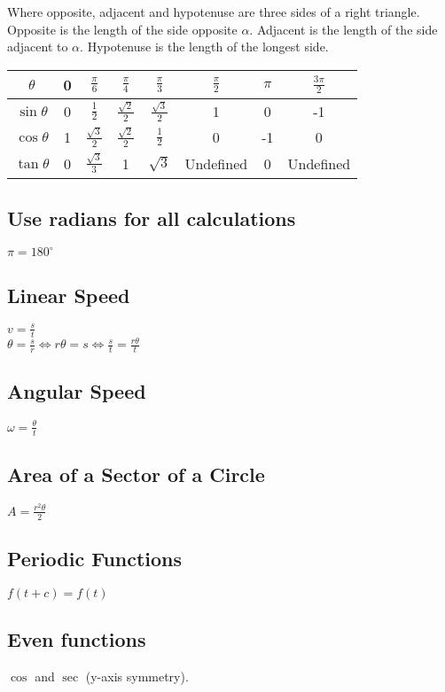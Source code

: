 \documentclass{amsart}
\begin{document}
\begin{multicols}{2}
    \begin{Small}
	Where opposite, adjacent and hypotenuse are three sides of a right triangle.
        Opposite is the length of the side opposite $\alpha$. Adjacent is the length of the side adjacent to $\alpha$.
        Hypotenuse is the length of the longest side.\vspace{4pt}
    \end{Small}
    
    \setlength{\extrarowheight}{4pt}
    \begin{tabular}[c]{|c|ccccccc|} \hline
        $\theta$&0&$\frac{\pi}{6}$&$\frac{\pi}{4}$&$\frac{\pi}{3}$&$\frac{\pi}{2}$&$\pi$&$\frac{3\pi}{2}$\\ \hline  
        $\sin\theta$&0&$\frac{1}{2}$&$\frac{\sqrt{2}}{2}$&$\frac{\sqrt{3}}{2}$&1&0&-1\\
        $\cos\theta$&1&$\frac{\sqrt{3}}{2}$&$\frac{\sqrt{2}}{2}$&$\frac{1}{2}$&0&-1&0\\
        $\tan\theta$&0&$\frac{\sqrt{3}}{3_{}}$&1&$\sqrt{3}$&Undefined&0&Undefined\\ \hline
    \end{tabular}
    
    \subsection*{Use radians for all calculations} $\pi =180^{\circ}$
    \subsection*{Linear Speed} $v=\frac{s}{t}$\\$\theta =\frac {s}{r}\Leftrightarrow r\theta = s\Leftrightarrow\frac{s}{t}=\frac{r\theta}{t}$
    \subsection*{Angular Speed} $\omega =\frac{\theta }{t}$
    \subsection*{Area of a Sector of a Circle} $A=\frac{r^2\theta }{2}$
    \subsection*{Periodic Functions} $f(t+c)=f(t)$
    \subsection*{Even functions} $\cos$ and $\sec$  (y-axis symmetry).

\end{multicols}
\end{document}
